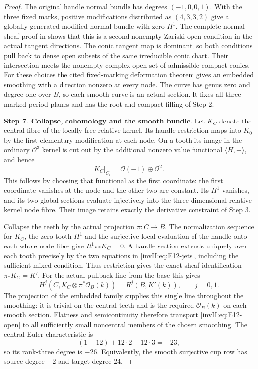 \begin{proof}
The original handle normal bundle has degrees $(-1,0,0,1)$.
With the three fixed marks, positive modifications distributed as
$(4,3,3,2)$ give a globally generated modified normal bundle with
zero $H^1$. The complete normal-sheaf proof in
\cite[Proposition \texttt{comb}, equation \texttt{originalnormal}
and the subsequent twelve-tooth bound]{Viaclovsky2026Combs}
shows that this is a second nonempty Zariski-open condition in the
actual tangent directions. The conic tangent map is dominant, so
both conditions pull back to dense open subsets of the same
irreducible conic chart. Their intersection meets the nonempty
complex-open set of admissible compact conics.
For these choices the cited fixed-marking deformation theorem
gives an embedded smoothing with a direction nonzero at every
node. The curve has genus zero and degree one over $B$, so each
smooth curve is an actual section. It fixes all three marked
period planes and has the root and compact filling of Step 2.

\noindent\textbf{Step 7. Collapse, cohomology and the smooth bundle.}
Let $K_C$ denote the central fibre of the locally free relative
kernel. Its handle restriction maps into $K_0$ by the first
elementary modification at each node. On a tooth its image in the
ordinary $\mathcal O^3$ kernel is cut out by the additional nonzero
value functional $\langle H,-\rangle$, and hence
\[
 K_C|_{C_i}=\mathcal O(-1)\oplus\mathcal O^2.
\]
This follows by choosing that functional as the first coordinate:
the first coordinate vanishes at the node and the other two are
constant. Its $H^1$ vanishes, and its two global sections evaluate
injectively into the three-dimensional relative-kernel node fibre.
Their image retains exactly the derivative constraint of Step 3.

Collapse the teeth by the actual projection $\pi:C\to B$.
The normalization sequence for $K_C$, the zero tooth $H^1$ and the
surjective local evaluation of the handle onto each whole node
fibre give $R^1\pi_*K_C=0$. A handle section extends uniquely over
each tooth precisely by the two equations in
\eqref{invII:eq:E12-jets}, including the sufficient mixed condition.
Thus restriction gives the exact sheaf identification
$\pi_*K_C=K'$. For the actual pullback line from the base this gives
\[
 H^j(C,K_C\otimes\pi^*\mathcal O_B(k))
       =H^j(B,K'(k)),\qquad j=0,1.
\]
The projection of the embedded family supplies this single line
throughout the smoothing: it is trivial on the central teeth and
is the required $\mathcal O_B(k)$ on each smooth section.
Flatness and semicontinuity therefore transport
\eqref{invII:eq:E12-open} to all sufficiently small noncentral
members of the chosen smoothing.
The central Euler characteristic is
\[
 (1-12)+12\cdot2-12\cdot3=-23,
\]
so its rank-three degree is $-26$. Equivalently, the smooth
surjective cup row has source degree $-2$ and target degree $24$.


\end{proof}
